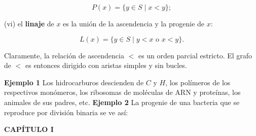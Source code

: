 {\[P(x) = \{y \in S \mid x < y\};\]

(vi) el \textbf{linaje} de \( x \) es la unión de la ascendencia y la progenie de \( x \):

\[L(x) = \{y \in S \mid y < x \text{ o } x < y\}.\]

Claramente, la relación de ascendencia \( < \) es un orden parcial estricto. El grafo de \( < \) es entonces dirigido con aristas simples y sin bucles.

\textbf{Ejemplo 1} Los hidrocarburos descienden de \( C \) y \( H \), los polímeros de los respectivos monómeros, los ribosomas de moléculas de ARN y proteínas, los animales de sus padres, etc. \textbf{Ejemplo 2} La progenie de una bacteria que se reproduce por división binaria se ve así:
}

\newpage
\fancyhf{}
\fancyhead[l]{\thepage}
\begin{center}
{\fontsize{13}{16}\selectfont \textbf{CAPÍTULO I}}
\end{center}
\vspace{0.5cm}

